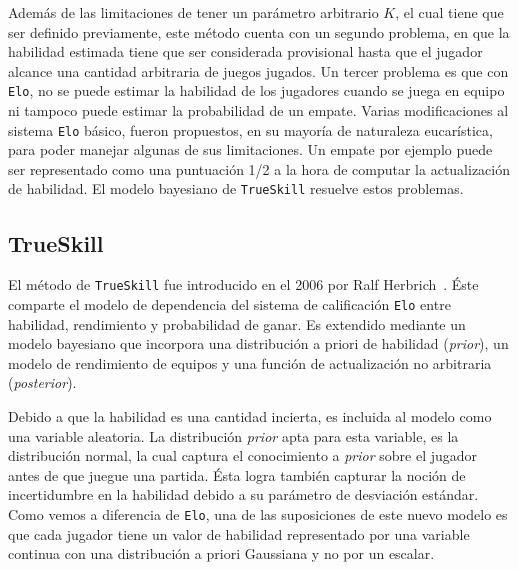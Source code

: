 \documentclass[11pt,twoside, spanish]{report} %
\begin{document}
Adem\'as de las limitaciones de tener un par\'ametro arbitrario $K$, el cual tiene que ser definido previamente, este m\'etodo cuenta con un segundo problema, en que la habilidad estimada tiene que ser considerada provisional hasta que el jugador alcance una cantidad arbitraria de juegos jugados.
Un tercer problema es que con \texttt{Elo}, no se puede estimar la habilidad de los jugadores cuando se juega en equipo ni tampoco puede estimar la probabilidad de un empate.
Varias modificaciones al sistema \texttt{Elo} b\'asico, fueron propuestos, en su mayor\'ia de naturaleza eucar\'istica, para poder manejar algunas de sus limitaciones.
Un empate por ejemplo puede ser representado como una puntuaci\'on 1/2 a la hora de computar la actualizaci\'on de habilidad.
El modelo bayesiano de \texttt{TrueSkill} resuelve estos problemas.




\subsection{TrueSkill}

El m\'etodo de  \texttt{TrueSkill}  fue introducido en el 2006 por Ralf Herbrich~\cite{Herbrich2007}.
\'Este comparte el modelo de dependencia del sistema de calificaci\'on \texttt{Elo} entre habilidad, rendimiento y probabilidad de ganar.
Es extendido mediante un modelo bayesiano que incorpora una distribuci\'on a priori de habilidad (\textit{prior}), un modelo de rendimiento de equipos y una funci\'on de actualizaci\'on no arbitraria (\textit{posterior}).

Debido a que la habilidad es una cantidad incierta,  es incluida al modelo como una variable aleatoria.
La distribuci\'on  \textit{prior} apta para esta variable, es la distribuci\'on normal, la cual captura el conocimiento a \textit{prior} sobre el jugador antes de que juegue una partida.
\'Esta logra tambi\'en capturar la noci\'on de incertidumbre en la habilidad debido a su par\'ametro de desviaci\'on est\'andar.
Como vemos a diferencia de \texttt{Elo}, una de las suposiciones de este nuevo modelo es que cada jugador tiene un valor de habilidad representado por una variable continua con una distribuci\'on a priori Gaussiana y no por un escalar.
\end{document}

